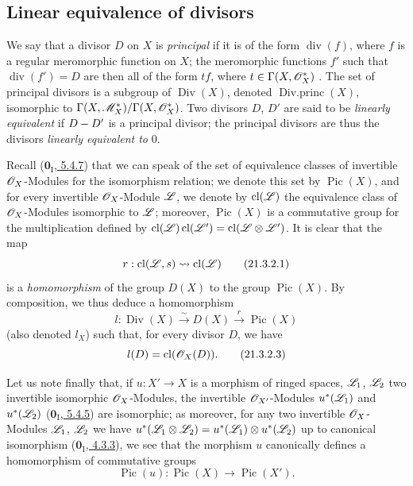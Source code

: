 
\subsection{Linear equivalence of divisors}
\label{subsection:IV.21.3}

\begin{env}[21.3.1]
\label{IV.21.3.1}
We say that a divisor $D$ on $X$ is \emph{principal} if it is of the form $\operatorname{div}(f)$, where $f$ is a regular meromorphic function on $X$;
the meromorphic functions $f'$ such that $\operatorname{div}(f')=D$ are then all of the form $tf$, where $t\in\Gamma(X,\mathscr{O}_X^*)$ .
The set of principal divisors is a subgroup of $\operatorname{Div}(X)$, denoted $\operatorname{Div.princ}(X)$, isomorphic to $\Gamma(X,\mathscr{M}_X^*)/\Gamma(X,\mathscr{O}_X^*)$.
Two divisors $D$, $D'$ are said to be \emph{linearly equivalent} if $D- D'$ is a principal divisor;
the principal divisors are thus the divisors \emph{linearly equivalent to} $0$.
\end{env}

\begin{env}[21.3.2]
\label{IV.21.3.2}
Recall (\hyperref[0.5.4.7]{$\mathbf{0}_{\mathrm{I}}$, 5.4.7}) that we can speak of the set of equivalence classes of invertible $\mathscr{O}_X$-Modules for the isomorphism relation;
we denote this set by $\operatorname{Pic}(X)$, and for every invertible $\mathscr{O}_X$-Module $\mathscr{L}$, we denote by $\operatorname{cl}(\mathscr{L})$ the equivalence class of $\mathscr{O}_X$-Modules isomorphic to $\mathscr{L}$;
moreover, $\operatorname{Pic}(X)$ is a commutative group for the multiplication defined by $\operatorname{cl}(\mathscr{L})\operatorname{cl}(\mathscr{L}')=\operatorname{cl}(\mathscr{L}\otimes\mathscr{L}')$.
It is clear that the map
\[
\label{IV.21.3.2.1}
  r:\operatorname{cl}(\mathscr{L},s)\leadsto\operatorname{cl}(\mathscr{L})
  \tag{21.3.2.1}
\]
is a \emph{homomorphism} of the group $D(X)$  to the group $\operatorname{Pic}(X)$.
By composition, we thus deduce a homomorphism
\[
\label{IV.21.3.2.2}
  l:\operatorname{Div}(X)\xrightarrow{\sim}D(X)\xrightarrow{r}\operatorname{Pic}(X)
  \tag{21.3.2.2}
\]
(also denoted $l_X$) such that, for every divisor $D$, we have
\[
\label{IV.21.3.2.3}
  l(D)=\operatorname{cl}(\mathscr{O}_X(D)).
  \tag{21.3.2.3}
\]

Let us note finally that, if $u:X'\to X$ is a morphism of ringed spaces, $\mathscr{L}_1$, $\mathscr{L}_2$ two invertible isomorphic $\mathscr{O}_X$-Modules, the invertible $\mathscr{O}_{X'}$-Modules $u^*(\mathscr{L}_1)$ and $u^*(\mathscr{L}_2)$ (\hyperref[0.5.4.5]{$\mathbf{0}_{\mathrm{I}}$, 5.4.5}) are isomorphic;
as moreover, for any two invertible $\mathscr{O}_X$-Modules $\mathscr{L}_1$, $\mathscr{L}_2$ we have $u^*(\mathscr{L}_1\otimes\mathscr{L}_2)=u^*(\mathscr{L}_1)\otimes u^*(\mathscr{L}_2)$ up to canonical isomorphism (\hyperref[0.4.3.3]{$\mathbf{0}_{\mathrm{I}}$, 4.3.3}), we see that the morphism $u$ canonically defines a homomorphism of commutative groups
\[
\label{IV.21.3.2.4}
  \operatorname{Pic}(u):\operatorname{Pic}(X)\to\operatorname{Pic}(X').
  \tag{21.3.2.4}
\]
\end{env}

